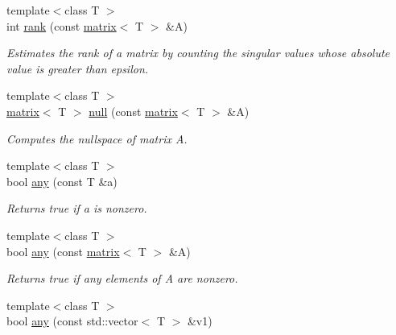 \begin{DoxyCompactItemize}
\item 
\hypertarget{namespacekeycpp_aeb9efbc77cc58fa22403ea7ae5f4555c}{{\footnotesize template$<$class T $>$ }\\int \hyperlink{namespacekeycpp_aeb9efbc77cc58fa22403ea7ae5f4555c}{rank} (const \hyperlink{classkeycpp_1_1matrix}{matrix}$<$ T $>$ \&A)}\label{namespacekeycpp_aeb9efbc77cc58fa22403ea7ae5f4555c}

\begin{DoxyCompactList}\small\item\em Estimates the rank of a matrix by counting the singular values whose absolute value is greater than epsilon. \end{DoxyCompactList}\item 
\hypertarget{namespacekeycpp_a8f497e2da901adba0e1257be943595a1}{{\footnotesize template$<$class T $>$ }\\\hyperlink{classkeycpp_1_1matrix}{matrix}$<$ T $>$ \hyperlink{namespacekeycpp_a8f497e2da901adba0e1257be943595a1}{null} (const \hyperlink{classkeycpp_1_1matrix}{matrix}$<$ T $>$ \&A)}\label{namespacekeycpp_a8f497e2da901adba0e1257be943595a1}

\begin{DoxyCompactList}\small\item\em Computes the nullspace of matrix A. \end{DoxyCompactList}\item 
\hypertarget{namespacekeycpp_a70b89ab3e8f66f86c47c3bde004d4487}{{\footnotesize template$<$class T $>$ }\\bool \hyperlink{namespacekeycpp_a70b89ab3e8f66f86c47c3bde004d4487}{any} (const T \&a)}\label{namespacekeycpp_a70b89ab3e8f66f86c47c3bde004d4487}

\begin{DoxyCompactList}\small\item\em Returns true if a is nonzero. \end{DoxyCompactList}\item 
\hypertarget{namespacekeycpp_ade6d308fd22d34ad4860e5fcd22ccb39}{{\footnotesize template$<$class T $>$ }\\bool \hyperlink{namespacekeycpp_ade6d308fd22d34ad4860e5fcd22ccb39}{any} (const \hyperlink{classkeycpp_1_1matrix}{matrix}$<$ T $>$ \&A)}\label{namespacekeycpp_ade6d308fd22d34ad4860e5fcd22ccb39}

\begin{DoxyCompactList}\small\item\em Returns true if any elements of A are nonzero. \end{DoxyCompactList}\item 
\hypertarget{namespacekeycpp_a01b100190bc21b024340b7bddd4467dd}{{\footnotesize template$<$class T $>$ }\\bool \hyperlink{namespacekeycpp_a01b100190bc21b024340b7bddd4467dd}{any} (const std\-::vector$<$ T $>$ \&v1)}\label{namespacekeycpp_a01b100190bc21b024340b7bddd4467dd}


\end{DoxyCompactItemize}
